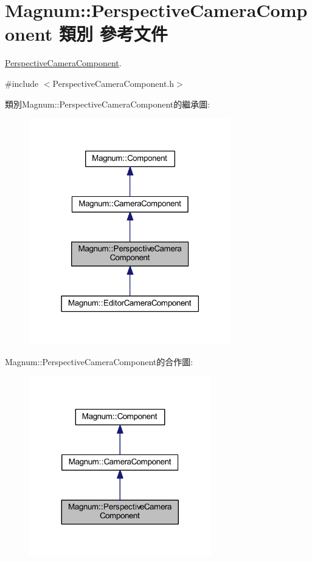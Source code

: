 \hypertarget{class_magnum_1_1_perspective_camera_component}{}\section{Magnum\+:\+:Perspective\+Camera\+Component 類別 參考文件}
\label{class_magnum_1_1_perspective_camera_component}


\hyperlink{class_magnum_1_1_perspective_camera_component}{Perspective\+Camera\+Component}.  




{\ttfamily \#include $<$Perspective\+Camera\+Component.\+h$>$}



類別\+Magnum\+:\+:Perspective\+Camera\+Component的繼承圖\+:\nopagebreak
\begin{figure}[H]
\begin{center}
\leavevmode
\includegraphics[width=249pt]{class_magnum_1_1_perspective_camera_component__inherit__graph}
\end{center}
\end{figure}


Magnum\+:\+:Perspective\+Camera\+Component的合作圖\+:\nopagebreak
\begin{figure}[H]
\begin{center}
\leavevmode
\includegraphics[width=224pt]{class_magnum_1_1_perspective_camera_component__coll__graph}
\end{center}
\end{figure}
